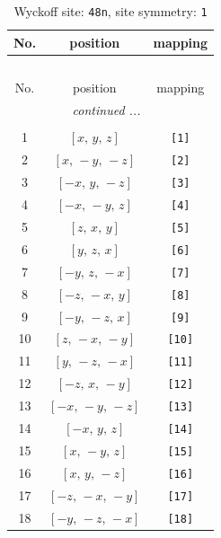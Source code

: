 \documentclass[fleqn,8pt]{jsarticle}
\begin{document}
\renewcommand{\arraystretch}{1.2}
\begin{longtable}{ccc}
\caption{Wyckoff site: {\tt 48n}, site symmetry: {\tt 1}}
 \\
 \hline \hline
No. & position & mapping \\ \hline \endfirsthead

\multicolumn{2}{l}{\tablename\ \thetable{}} \\
 \hline \hline
No. & position & mapping \\ \hline \endhead

 \hline \hline
\multicolumn{2}{r}{\footnotesize\it continued ...} \\ \endfoot

 \hline \hline
\multicolumn{2}{r}{} \\ \endlastfoot

1 & $\left[ x,\, y,\, z \right]$ & {\tt [1]} \\ \hline
2 & $\left[ x,\, - y,\, - z \right]$ & {\tt [2]} \\ \hline
3 & $\left[ - x,\, y,\, - z \right]$ & {\tt [3]} \\ \hline
4 & $\left[ - x,\, - y,\, z \right]$ & {\tt [4]} \\ \hline
5 & $\left[ z,\, x,\, y \right]$ & {\tt [5]} \\ \hline
6 & $\left[ y,\, z,\, x \right]$ & {\tt [6]} \\ \hline
7 & $\left[ - y,\, z,\, - x \right]$ & {\tt [7]} \\ \hline
8 & $\left[ - z,\, - x,\, y \right]$ & {\tt [8]} \\ \hline
9 & $\left[ - y,\, - z,\, x \right]$ & {\tt [9]} \\ \hline
10 & $\left[ z,\, - x,\, - y \right]$ & {\tt [10]} \\ \hline
11 & $\left[ y,\, - z,\, - x \right]$ & {\tt [11]} \\ \hline
12 & $\left[ - z,\, x,\, - y \right]$ & {\tt [12]} \\ \hline
13 & $\left[ - x,\, - y,\, - z \right]$ & {\tt [13]} \\ \hline
14 & $\left[ - x,\, y,\, z \right]$ & {\tt [14]} \\ \hline
15 & $\left[ x,\, - y,\, z \right]$ & {\tt [15]} \\ \hline
16 & $\left[ x,\, y,\, - z \right]$ & {\tt [16]} \\ \hline
17 & $\left[ - z,\, - x,\, - y \right]$ & {\tt [17]} \\ \hline
18 & $\left[ - y,\, - z,\, - x \right]$ & {\tt [18]} \\ \hline

\end{longtable}
\end{document}
